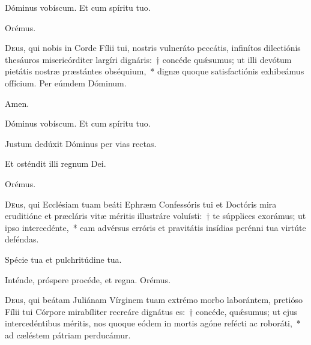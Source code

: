    
       
       \admagnificat
       
           
      
         
    
      \vv Dóminus vobíscum. \rr Et cum spíritu tuo.
  
  \oratio
  
  Orémus.
  
  \lettrine{D}{e}us, qui nobis in Corde Fílii tui, nostris vulneráto peccátis, infinítos dilectiónis thesáuros misericórditer largíri dignáris:~† concéde quǽsumus; ut illi devótum pietátis nostræ præstántes obséquium,~* dignæ quoque satisfactiónis exhibeámus offícium. Per eúmdem Dóminum.
  
  \rr Amen.
  
       \vv Dóminus vobíscum. \rr Et cum spíritu tuo.
       
       
         \vv Justum dedúxit Dóminus per vias rectas.
  
\rr Et osténdit illi regnum Dei.

 Orémus.

\lettrine{D}{e}us, qui Ecclésiam tuam beáti Ephræm Confessóris tui et Doctóris mira eruditióne et præcláris vitæ méritis illustráre voluísti:~† te súpplices exorámus; ut ipso intercedénte,~* eam advérsus erróris et pravitátis insídias perénni tua virtúte deféndas.


\vv Spécie tua et pulchritúdine tua.

\rr Inténde, próspere procéde, et regna.
\newpage
Orémus.

\lettrine{D}{e}us, qui beátam Juliánam Vírginem tuam extrémo morbo laborántem, pretióso Fílii tui Córpore mirabíliter recreáre dignátus es:~† concéde, quǽsumus; ut ejus intercedéntibus méritis, nos quoque eódem in mortis agóne refécti ac roboráti,~* ad cæléstem pátriam perducámur.
   
